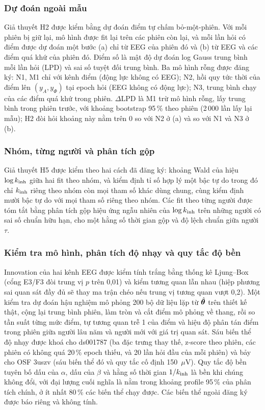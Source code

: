 \subsubsection{Dự đoán ngoài mẫu}
\label{sec:loso}
Giả thuyết H2 được kiểm bằng dự đoán điểm tự chấm bỏ-một-phiên. Với mỗi phiên bị giữ lại, mô hình được fit lại trên các phiên còn lại, và mỗi lần hỏi có điểm được dự đoán một bước (a) chỉ từ EEG của phiên đó và (b) từ EEG và các điểm quá khứ của phiên đó. Điểm số là mật độ dự đoán log Gauss trung bình mỗi lần hỏi (LPD) \cite{Vehtari2017} và sai số tuyệt đối trung bình. Ba mô hình rỗng được đăng ký: N1, M1 chỉ với kênh điểm (động lực không có EEG); N2, hồi quy tức thời của điểm lên $(y_A,y_\Phi)$ tại epoch hỏi (EEG không có động lực); N3, trung bình chạy của các điểm quá khứ trong phiên. $\Delta\mathrm{LPD}$ là M1 trừ mô hình rỗng, lấy trung bình trong phiên trước, với khoảng bootstrap 95\,\% theo phiên (2\,000 lần lấy lại mẫu); H2 đòi hỏi khoảng này nằm trên 0 so với N2 ở (a) và so với N1 và N3 ở (b).

\subsubsection{Nhóm, từng người và phân tích gộp}
Giả thuyết H5 được kiểm theo hai cách đã đăng ký: khoảng Wald của hiệu $\log k_{\mathrm{inh}}$ giữa hai fit theo nhóm, và kiểm định tỉ số hợp lý một bậc tự do trong đó chỉ $k_{\mathrm{inh}}$ riêng theo nhóm còn mọi tham số khác dùng chung, cùng kiểm định mười bậc tự do với mọi tham số riêng theo nhóm. Các fit theo từng người được tóm tắt bằng phân tích gộp hiệu ứng ngẫu nhiên của $\log k_{\mathrm{inh}}$ \cite{Viechtbauer2005} trên những người có sai số chuẩn hữu hạn, cho một hằng số thời gian gộp và độ lệch chuẩn giữa người $\tau$.

\subsubsection{Kiểm tra mô hình, phân tích độ nhạy và quy tắc độ bền}
Innovation của hai kênh EEG được kiểm tính trắng bằng thống kê Ljung--Box \cite{Ljung1978} (cổng E3/F3 đòi trung vị $p$ trên 0,01) và kiểm tương quan lẫn nhau (hiệp phương sai quan sát đầy đủ sẽ thay ma trận chéo nếu trung vị tương quan vượt 0,2). Một kiểm tra dự đoán hậu nghiệm \cite{Gelman1996} mô phỏng 200 bộ dữ liệu lặp từ $\hat{\boldsymbol{\theta}}$ trên thiết kế thật, cộng lại trung bình phiên, làm tròn và cắt điểm mô phỏng về thang, rồi so tần suất từng mức điểm, tự tương quan trễ 1 của điểm và hiệu độ phân tán điểm trong phiên giữa người lâu năm và người mới với giá trị quan sát. Sáu biến thể độ nhạy được khoá cho ds001787 (ba đặc trưng thay thế, z-score theo phiên, các phiên có không quá 20\,\% epoch thiếu, và 20 lần hỏi đầu của mỗi phiên) và bảy cho OSF 3uszv (sáu biến thể đó và quy tắc cố định 150~$\mu$V). Quy tắc độ bền tuyên bố dấu của $\alpha$, dấu của $\beta$ và hằng số thời gian $1/k_{\mathrm{inh}}$ là bền khi chúng không đổi, với đại lượng cuối nghĩa là nằm trong khoảng profile 95\,\% của phân tích chính, ở ít nhất 80\,\% các biến thể chạy được. Các biến thể ngoài đăng ký được báo riêng và không tính.

